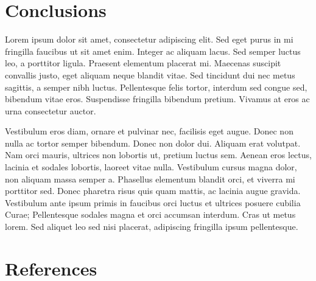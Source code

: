 
\section{Conclusions}
\label{sec:conclusions}

Lorem ipsum dolor sit amet, consectetur adipiscing elit. Sed eget purus in mi fringilla faucibus ut sit amet enim. Integer ac aliquam lacus. Sed semper luctus leo, a porttitor ligula. Praesent elementum placerat mi. Maecenas suscipit convallis justo, eget aliquam neque blandit vitae. Sed tincidunt dui nec metus sagittis, a semper nibh luctus. Pellentesque felis tortor, interdum sed congue sed, bibendum vitae eros. Suspendisse fringilla bibendum pretium. Vivamus at eros ac urna consectetur auctor.

Vestibulum eros diam, ornare et pulvinar nec, facilisis eget augue. Donec non nulla ac tortor semper bibendum. Donec non dolor dui. Aliquam erat volutpat. Nam orci mauris, ultrices non lobortis ut, pretium luctus sem. Aenean eros lectus, lacinia et sodales lobortis, laoreet vitae nulla. Vestibulum cursus magna dolor, non aliquam massa semper a. Phasellus elementum blandit orci, et viverra mi porttitor sed. Donec pharetra risus quis quam mattis, ac lacinia augue gravida. Vestibulum ante ipsum primis in faucibus orci luctus et ultrices posuere cubilia Curae; Pellentesque sodales magna et orci accumsan interdum. Cras ut metus lorem. Sed aliquet leo sed nisi placerat, adipiscing fringilla ipsum pellentesque.

\section{References}
\label{sec:references}